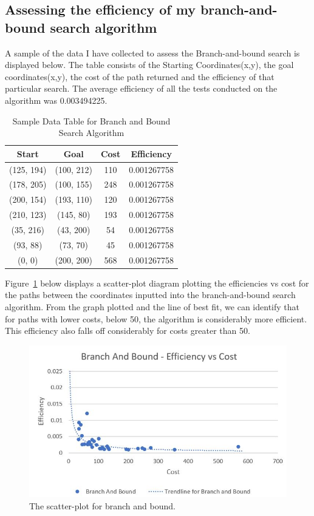 \documentclass[11pt,oneside]{article}
\begin{document}
\subsection{Assessing the efficiency of my branch-and-bound search algorithm}
A sample of the data I have collected to assess the Branch-and-bound search is displayed below. The table consists of the Starting Coordinates(x,y), the goal coordinates(x,y), the cost of the path returned and the efficiency of that particular search. The average efficiency of all the tests conducted on the algorithm was 0.003494225.

\begin{table}[H]
    \centering
    \begin{tabular}{|c|c|c|c|}
        Start        & Goal       & Cost & Efficiency \\ \hline
        (125, 194)   & (100, 212) & 110 & 0.001267758 \\
        (178, 205)   & (100, 155) & 248 & 0.001267758 \\
        (200, 154)   & (193, 110) & 120 & 0.001267758 \\
        (210, 123)   & (145, 80)  & 193 & 0.001267758 \\
        (35, 216)    & (43, 200)  & 54 & 0.001267758 \\
        (93, 88)     & (73, 70)   & 45 & 0.001267758 \\
        (0, 0)       & (200, 200) & 568 & 0.001267758 \\
    \end{tabular}
    \caption{Sample Data Table for Branch and Bound Search Algorithm}
    \label{tab:my_label}
\end{table}

Figure~\ref{fig:BnBEvC} below displays a scatter-plot diagram plotting the efficiencies vs cost for the paths between the coordinates inputted into the branch-and-bound search algorithm. From the graph plotted and the line of best fit, we can identify that for paths with lower costs, below 50, the algorithm is considerably more efficient. This efficiency also falls off considerably for costs greater than 50.

\begin{figure}[H]
\centering
  \includegraphics[scale=0.8]{BnB efficiency vs cost.JPG}
  \caption{The scatter-plot for branch and bound.}
  \label{fig:BnBEvC}
\end{figure} 
\end{document}
